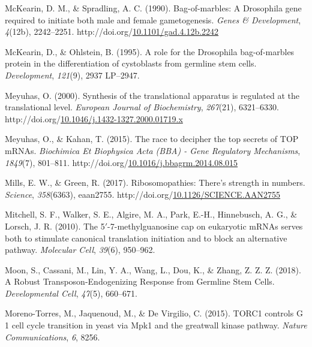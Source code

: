 \documentclass[12pt,oneside]{reedthesis}
\newlength{\cslhangindent}
\newenvironment{CSLReferences}[2] %
 {%
  \setlength{\parindent}{0pt}
  \ifodd #1 \everypar{\setlength{\hangindent}{\cslhangindent}}\ignorespaces\fi
  \ifnum #2 > 0
  \setlength{\parskip}{#2\baselineskip}
  \fi
 }%
 {}
\begin{document}
\begin{CSLReferences}{1}{0}
\leavevmode{}%
McKearin, D. M., \& Spradling, A. C. (1990). Bag-of-marbles: A {Drosophila} gene required to initiate both male and female gametogenesis. \emph{Genes \& Development}, \emph{4}(12b), 2242--2251. http://doi.org/\href{https://doi.org/10.1101/gad.4.12b.2242}{10.1101/gad.4.12b.2242}

\leavevmode{}%
McKearin, D., \& Ohlstein, B. (1995). A role for the {Drosophila} bag-of-marbles protein in the differentiation of cystoblasts from germline stem cells. \emph{Development}, \emph{121}(9), 2937 LP--2947.

\leavevmode{}%
Meyuhas, O. (2000). Synthesis of the translational apparatus is regulated at the translational level. \emph{European Journal of Biochemistry}, \emph{267}(21), 6321--6330. http://doi.org/\href{https://doi.org/10.1046/j.1432-1327.2000.01719.x}{10.1046/j.1432-1327.2000.01719.x}

\leavevmode{}%
Meyuhas, O., \& Kahan, T. (2015). The race to decipher the top secrets of {TOP mRNAs}. \emph{Biochimica Et Biophysica Acta (BBA) - Gene Regulatory Mechanisms}, \emph{1849}(7), 801--811. http://doi.org/\href{https://doi.org/10.1016/j.bbagrm.2014.08.015}{10.1016/j.bbagrm.2014.08.015}

\leavevmode{}%
Mills, E. W., \& Green, R. (2017). Ribosomopathies: {There}'s strength in numbers. \emph{Science}, \emph{358}(6363), eaan2755. http://doi.org/\href{https://doi.org/10.1126/SCIENCE.AAN2755}{10.1126/SCIENCE.AAN2755}

\leavevmode{}%
Mitchell, S. F., Walker, S. E., Algire, M. A., Park, E.-H., Hinnebusch, A. G., \& Lorsch, J. R. (2010). The 5{\({'}\)}-7-methylguanosine cap on eukaryotic {mRNAs} serves both to stimulate canonical translation initiation and to block an alternative pathway. \emph{Molecular Cell}, \emph{39}(6), 950--962.

\leavevmode{}%
Moon, S., Cassani, M., Lin, Y. A., Wang, L., Dou, K., \& Zhang, Z. Z. Z. (2018). A {Robust Transposon}-{Endogenizing Response} from {Germline Stem Cells}. \emph{Developmental Cell}, \emph{47}(5), 660--671.

\leavevmode{}%
Moreno-Torres, M., Jaquenoud, M., \& De Virgilio, C. (2015). {TORC1} controls {G} 1 cell cycle transition in yeast via {Mpk1} and the greatwall kinase pathway. \emph{Nature Communications}, \emph{6}, 8256.


\end{CSLReferences}
\end{document}
